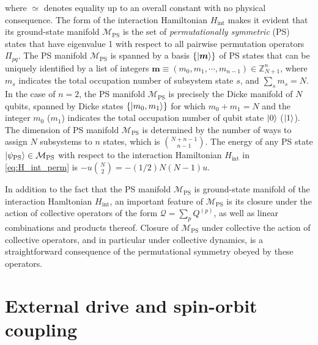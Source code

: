 \documentclass[nofootinbib,notitlepage,11pt]{revtex4-2}
\renewcommand{\t}{\text} %
\newcommand{\p}[1]{\left(#1\right)} %
\renewcommand{\set}[1]{\left\{#1\right\}} %
\renewcommand{\v}{\bm} %
\newcommand{\1}{\mathds{1}}
\newcommand{\M}{\mathcal{M}}
\newcommand{\Q}{\mathcal{Q}}
\newcommand{\ZZ}{\mathbb{Z}}
\newcommand{\PS}{\text{PS}}
\begin{document}
where $\simeq$ denotes equality up to an overall constant with no
physical consequence.  The form of the interaction Hamiltonian
$H_{\t{int}}$ makes it evident that its ground-state manifold
$\M_{\PS}$ is the set of {\it permutationally symmetric} (PS) states
that have eigenvalue 1 with respect to all pairwise permutation
operators $\Pi_{pq}$.  The PS manifold $\M_\PS$ is spanned by a basis
$\set{\ket{\v m}}$ of PS states that can be uniquely identified by a
list of integers $\v m\equiv\p{m_0,m_1,\cdots,m_{n-1}}\in\ZZ_{N+1}^n$,
where $m_s$ indicates the total occupation number of subsystem state
$s$, and $\sum_sm_s=N$.  In the case of $n=2$, the PS manifold
$\M_\PS$ is precisely the Dicke manifold \cite{dicke1954coherence} of
$N$ qubits, spanned by Dicke states $\set{\ket{m_0,m_1}}$ for which
$m_0+m_1=N$ and the integer $m_0$ ($m_1$) indicates the total
occupation number of qubit state $\ket{0}$ ($\ket{1}$).  The dimension
of PS manifold $\M_\PS$ is determined by the number of ways to assign
$N$ subsystems to $n$ states, which is ${N+n-1 \choose n-1}$.  The
energy of any PS state $\ket{\psi_\PS}\in\M_\PS$ with respect to the
interaction Hamiltonian $H_{\t{int}}$ in \eqref{eq:H_int_perm} is
$-u{N \choose 2}=-\p{1/2}N\p{N-1}u$.

In addition to the fact that the PS manifold $\M_\PS$ is ground-state
manifold of the interaction Hamltonian $H_{\t{int}}$, an important
feature of $\M_\PS$ is its closure under the action of collective
operators of the form $\Q=\sum_pQ^{(p)}$, as well as linear
combinations and products thereof.  Closure of $\M_\PS$ under
collective the action of collective operators, and in particular under
collective dynamics, is a straightforward consequence of the
permutational symmetry obeyed by these operators.

\section{External drive and spin-orbit coupling}
\label{sec:drive_SOC}
\end{document}
